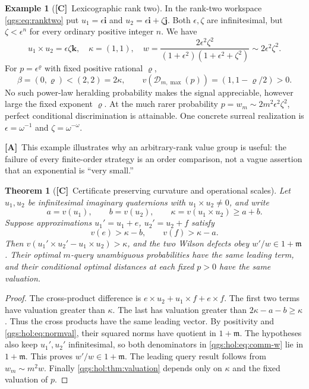 \documentclass[11pt,oneside]{article}
\numberwithin{equation}{section}
\theoremstyle{plain}
\newtheorem{theorem}{Theorem}[section]
\theoremstyle{definition}
\newtheorem{example}[example]{Example}
\theoremstyle{remark}
\newcommand{\mm}{\mathfrak m}
\newcommand{\TD}{\mathcal D}
\newcommand{\qi}{\mathbf i}
\newcommand{\qj}{\mathbf j}
\newcommand{\qk}{\mathbf k}
\newcommand{\TC}{\textcolor{TierC}{\textsf{\bfseries[C]}}}
\newcommand{\TA}{\textcolor{TierA}{\textsf{\bfseries[A]}}}
\begin{document}
\begin{example}[\TC\ Lexicographic rank two]\label{qgs:hol:ex:ranktwo}
In the rank-two workspace \eqref{qgs:eq:ranktwo} put $u_1=\epsilon\qi$ and $u_2=\epsilon\qi+\zeta\qj$. Both $\epsilon,\zeta$ are infinitesimal, but $\zeta<\epsilon^n$ for every ordinary positive integer $n$. We have
\[
 u_1\times u_2=\epsilon\zeta\qk,\quad \kappa=(1,1),\quad
 w=\frac{2\epsilon^2\zeta^2}{(1+\epsilon^2)(1+\epsilon^2+\zeta^2)}\sim2\epsilon^2\zeta^2.
\]
For $p=\epsilon^\varrho$ with fixed positive rational $\varrho$,
\[
 \beta=(0,\varrho)<(2,2)=2\kappa,
 \qquad
 v(\TD_{m,\max}(p))=(1,1-\varrho/2)>0.
\]
No such power-law heralding probability makes the signal appreciable, however large the fixed exponent $\varrho$. At the much rarer probability $p=w_m\sim2m^2\epsilon^2\zeta^2$, perfect conditional discrimination is attainable. One concrete surreal realization is $\epsilon=\omega^{-1}$ and $\zeta=\omega^{-\omega}$.
\end{example}

\TA\ This example illustrates why an arbitrary-rank value group is useful: the failure of every finite-order strategy is an order comparison, not a vague assertion that an exponential is ``very small.''

\begin{theorem}[\TC\ Certificate preserving curvature and operational scales]\label{qgs:hol:thm:precision}
Let $u_1,u_2$ be infinitesimal imaginary quaternions with $u_1\times u_2\neq0$, and write
\[
 a=v(u_1),\qquad b=v(u_2),\qquad \kappa=v(u_1\times u_2)\geq a+b.
\]
Suppose approximations $u_1'=u_1+e$, $u_2'=u_2+f$ satisfy
\begin{equation}\label{qgs:hol:eq:precisionhyp}
 v(e)>\kappa-b,\qquad v(f)>\kappa-a.
\end{equation}
Then $v(u_1'\times u_2'-u_1\times u_2)>\kappa$, and the two Wilson defects obey $w'/w\in1+\mm$. Their optimal $m$-query unambiguous probabilities have the same leading term, and their conditional optimal distances at each fixed $p>0$ have the same valuation.
\end{theorem}
\begin{proof}
The cross-product difference is $e\times u_2+u_1\times f+e\times f$. The first two terms have valuation greater than $\kappa$. The last has valuation greater than $2\kappa-a-b\geq\kappa$. Thus the cross products have the same leading vector. By positivity and \eqref{qgs:hol:eq:normval}, their squared norms have quotient in $1+\mm$. The hypotheses also keep $u_1',u_2'$ infinitesimal, so both denominators in \eqref{qgs:hol:eq:comm-w} lie in $1+\mm$. This proves $w'/w\in1+\mm$. The leading query result follows from $w_m\sim m^2w$. Finally \cref{qgs:hol:thm:valuation} depends only on $\kappa$ and the fixed valuation of $p$.
\end{proof}
\end{document}
